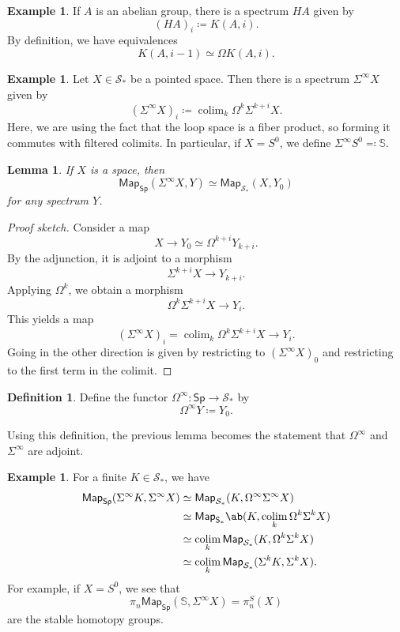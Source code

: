 \documentclass[10pt, oneside]{memoir}
\newtheorem{lem}[thm]{Lemma}
\theoremstyle{definition}
\newtheorem{defn}[thm]{Definition}
\newtheorem{exm}[thm]{Example}
\theoremstyle{remark}
\theoremstyle{plain}
\theoremstyle{definition}
\theoremstyle{remark}
\newcommand{\bS}{\mathbb{S}}
\newcommand{\mc}[1]{\mathcal{#1}}
\newcommand{\ms}[1]{\mathsf{#1}}
\newcommand{\1}{\mathbf{1}}
\newcommand{\2}{\mathbf{2}}
\newcommand{\3}{\mathbf{3}}
\DeclareMathOperator*{\colim}{colim}
\begin{document}
\begin{exm}
    If $A$ is an abelian group, there is a spectrum $HA$ given by
    \[ (HA)_i \coloneqq K(A, i). \]
    By definition, we have equivalences
    \[ K(A, i-1) \simeq \Omega K(A, i). \]
\end{exm}

\begin{exm}
    Let $X \in \mc{S}_*$ be a pointed space. Then there is a spectrum $\Sigma^{\infty} X$ given by
    \[ (\Sigma^{\infty}X)_i \coloneqq \colim_k \Omega^k \Sigma^{k+i} X. \]
    Here, we are using the fact that the loop space is a fiber product, so forming it commutes with filtered colimits. In particular, if $X = S^0$, we define $\Sigma^{\infty} S^0 \eqqcolon \bS$.
\end{exm}

\begin{lem}
    If $X$ is a space, then
    \[ \ms{Map}_{\ms{Sp}}(\Sigma^{\infty} X, Y) \simeq \ms{Map}_{\mc{S}_*} (X, Y_0) \]
    for any spectrum $Y$.
\end{lem}

\begin{proof}[Proof sketch]
    Consider a map
    \[ X \to Y_0 \simeq \Omega^{k+i} Y_{k+i}. \]
    By the adjunction, it is adjoint to a morphism
    \[ \Sigma^{k+i} X \to Y_{k+i}. \]
    Applying $\Omega^k$, we obtain a morphism
    \[ \Omega^k \Sigma^{k+i} X \to Y_i. \]
    This yields a map
    \[ (\Sigma^{\infty} X)_i = \colim_k \Omega^k \Sigma^{k+i} X \to Y_i. \]
    Going in the other direction is given by restricting to $(\Sigma^{\infty} X)_0$ and restricting to the first term in the colimit.
\end{proof}

\begin{defn}
    Define the functor $\Omega^{\infty} \colon \ms{Sp} \to \mc{S}_*$ by
    \[ \Omega^{\infty} Y \coloneqq Y_0. \]
\end{defn}

Using this definition, the previous lemma becomes the statement that $\Omega^{\infty}$ and $\Sigma^{\infty}$ are adjoint.

\begin{exm}
    For a finite $K \in \mc{S}_*$, we have
    \begin{align*}
        \ms{Map}_{\ms{Sp}}(\Sigma^{\infty} K, \Sigma^{\infty} X) &\simeq \ms{Map}_{\mc{S}_*}(K, \Omega^{\infty} \Sigma^{\infty} X) \\
        &\simeq \ms{Map}_{\ms{S}_*} \ab(K, \colim_k \Omega^k\Sigma^k X) \\
        &\simeq \colim_k \ms{Map}_{\mc{S}_*} (K, \Omega^k \Sigma^k X) \\
        &\simeq \colim_k \ms{Map}_{\mc{S}_*} (\Sigma^k K, \Sigma^k X).
    \end{align*}
    For example, if $X = S^0$, we see that
    \[ \pi_n \ms{Map}_{\ms{Sp}}(\bS, \Sigma^{\infty} X) = \pi_n^S(X) \]
    are the stable homotopy groups.
\end{exm}
\end{document}
